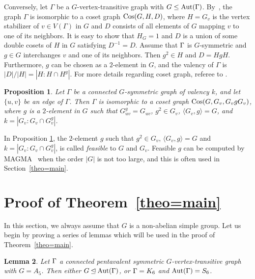 \documentclass[12pt]{article}
\newtheorem{lem}{Lemma}[section]%
\newtheorem{prop}[lem]{Proposition}%
\def\Aut{\hbox{\rm Aut}}
\def\Cos{\hbox{\rm Cos}}
\begin{document}
Conversely, let $\Gamma$ be a $G$-vertex-transitive graph with $G\leq \Aut(\Gamma)$. By~\cite{Sabidussi}, the graph $\Gamma$ is isomorphic to a coset graph $\Cos(G,H,D)$, where $H=G_{v}$ is the vertex stabilizer of $v\in V(\Gamma)$ in $G$ and $D$ consists of all elements of $G$ mapping $v$ to one of its neighbors.
It is easy to show that $H_G=1$ and $D$ is a union of some double cosets of $H$ in $G$ satisfying $D^{-1}=D$. Assume that $\Gamma$ is $G$-symmetric and $g \in G$ interchanges $v$ and one of its neighbors. Then $g^2 \in H$ and $D=HgH$. Furthermore, $g$ can be chosen as a $2$-element in $G$, and the valency of $\Gamma$ is $|D|/|H|=|H:H\cap H^g|$. For more details regarding coset graph, referee to  \cite{FangP,Lorimer,Miller,Sabidussi}.

\begin{prop}\label{prop=cosetgraph}
Let $\Gamma$ be a connected $G$-symmetric graph of valency $k$, and let $\{u,v\}$ be an edge of $\Gamma$. Then $ \Gamma $ is isomorphic to a coset graph $\Cos(G,G_{v},G_{v}gG_{v})$,
where $g$ is a $2$-element in $G$ such that $G_{uv}^{g}=G_{uv}$, $g^2\in G_{v}$,  $\langle G_v,g\rangle=G$, and $k=|G_v:G_v \cap G_{v}^{g}|$.
\end{prop}

In Proposition \ref{prop=cosetgraph}, the $2$-element $g$ such that $g^2\in G_{v}$,  $\langle G_v,g\rangle=G$ and $k=|G_v:G_v \cap G_{v}^{g}|$, is called {\em feasible} to $G$ and $G_v$. Feasible $g$ can be computed by MAGMA~\cite{magma} when the order $|G|$ is not too large, and this is often used in Section~\ref{theo=main}.

\section{Proof of Theorem~\ref{theo=main}}

In this section, we always assume that $G$ is a non-abelian simple group. Let us begin by proving a series
of lemmas which will be used in the proof of Theorem~\ref{theo=main}.

\begin{lem}\label{lem=A_5}
Let $\Gamma$ a connected pentavalent symmetric $G$-vertex-transitive graph with $G=A_5$. Then either $G\unlhd \Aut(\G)$, or $\Gamma=K_6$ and $\Aut(\G)=S_6$.
\end{lem}
\end{document}

